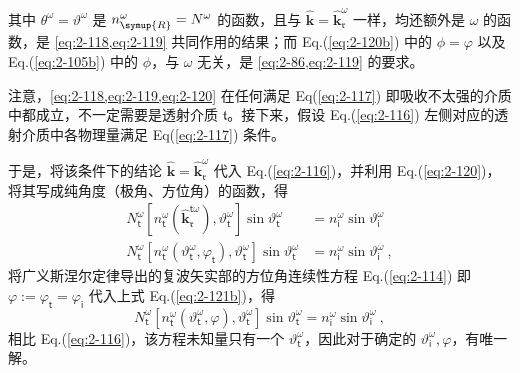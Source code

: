 其中 $\theta^{\omega} = \vartheta^{\omega}$ 是 $n^\omega_{\symup{R}} = N^{\omega}$ 的函数，且与 $\hat{\symbf k} = \hat{\symbf k}_{\mathfrak{r}}^\omega$ 一样，均还额外是 $\omega$ 的函数，是 \cref{eq:2-118,eq:2-119} 共同作用的结果；而 Eq.(\ref{eq:2-120b}) 中的 $\phi = \varphi$ 以及 Eq.(\ref{eq:2-105b}) 中的 $\phi$，与 $\omega$ 无关，是 \cref{eq:2-86,eq:2-119} 的要求。

注意，\cref{eq:2-118,eq:2-119,eq:2-120} 在任何满足 Eq(\ref{eq:2-117}) 即吸收不太强的介质中都成立，不一定需要是透射介质 $\mathfrak{t}$。接下来，假设 Eq.(\ref{eq:2-116}) 左侧对应的透射介质中各物理量满足 Eq(\ref{eq:2-117}) 条件。

于是，将该条件下的结论 $\hat{\symbf k} = \hat{\symbf k}_{\mathfrak{r}}^\omega$ 代入 Eq.(\ref{eq:2-116})，并利用 Eq.(\ref{eq:2-120})，将其写成纯角度（极角、方位角）的函数，得
\begin{subequations} \label{eq:2-121}
\begin{align}
	N^{\omega}_{\mathsf{t}} \left[ n^{\omega}_{\mathsf{t}} \left( \hat{\symbf k}^{\mathsf{t}\omega}_{\mathfrak{r}} \right), \vartheta^{\omega}_{\mathsf{t}} \right] \sin \vartheta^{\omega}_{\mathsf{t}} &= n^{\omega}_{\mathsf{i}} \sin \vartheta^{\omega}_{\mathsf{i}} \label{eq:2-121a} \\ N^{\omega}_{\mathsf{t}} \left[ n^{\omega}_{\mathsf{t}} \left( \vartheta^{\omega}_{\mathsf{t}}, \varphi_{\mathsf{t}} \right), \vartheta^{\omega}_{\mathsf{t}} \right] \sin \vartheta^{\omega}_{\mathsf{t}} &= n^{\omega}_{\mathsf{i}} \sin \vartheta^{\omega}_{\mathsf{i}} \label{eq:2-121b}~,
\end{align}
\end{subequations}
将广义斯涅尔定律导出的复波矢实部的方位角连续性方程 Eq.(\ref{eq:2-114}) 即 $\varphi := \varphi_{\mathsf{t}} = \varphi_{\mathsf{i}}$ 代入上式 Eq.(\ref{eq:2-121b})，得
\begin{equation} \label{eq:2-122}
	N^{\omega}_{\mathsf{t}} \left[ n^{\omega}_{\mathsf{t}} \left( \vartheta^{\omega}_{\mathsf{t}}, \varphi \right), \vartheta^{\omega}_{\mathsf{t}} \right] \sin \vartheta^{\omega}_{\mathsf{t}} = n^{\omega}_{\mathsf{i}} \sin \vartheta^{\omega}_{\mathsf{i}} ~,
\end{equation}
相比 Eq.(\ref{eq:2-116})，该方程未知量只有一个 $\vartheta^{\omega}_{\mathsf{t}}$，因此对于确定的 $\vartheta^{\omega}_{\mathsf{i}}, \varphi$，有唯一解。

